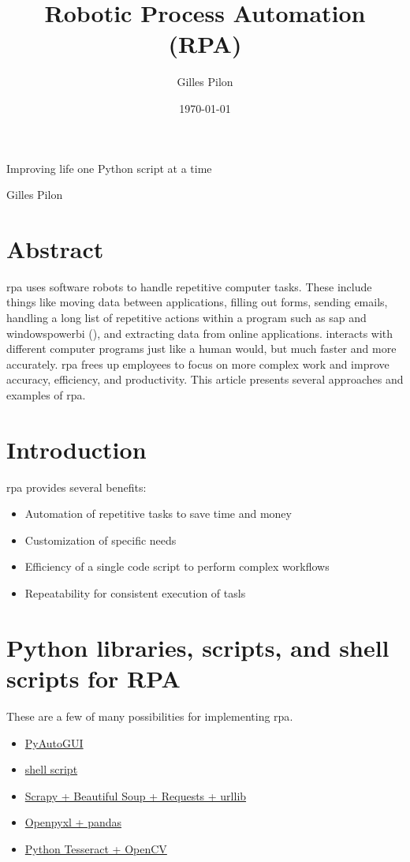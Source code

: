 \documentclass[10pt, letterpaper, twoside]{article}
\title{Robotic Process Automation (RPA)}
\author{Gilles Pilon}
\date{\today}
\begin{document}
\maketitle
\renewcommand{\epigraphflush}{flushleft}
\renewcommand{\textflush}{flushleft}
\renewcommand{\sourceflush}{flushleft}
\epigraph{Improving life one Python script at a time}{Gilles Pilon}
\section*{Abstract}
\Gls{rpa} uses software robots to handle repetitive computer tasks. These include things like moving data between applications, filling out forms, sending emails, handling a long list of repetitive actions within a program such as \Gls{sap} and \Gls{windowspowerbi} (\cite{windowspowerbi}), and extracting data from online applications.  interacts with different computer programs just like a human would, but much faster and more accurately. \Gls{rpa} frees up employees to focus on more complex work and improve accuracy, efficiency, and productivity. This article presents several approaches and examples of \Gls{rpa}.
\newpage
\tableofcontents
\newpage
\section{Introduction}\label{sec:introduction}
\Gls{rpa} provides several benefits:
\begin{itemize}
    \item{Automation of repetitive tasks to save time and money}
    \item{Customization of specific needs}
    \item{Efficiency of a single code script to perform complex workflows}
    \item{Repeatability for consistent execution of tasls}
\end{itemize}
\section{Python libraries, scripts, and shell scripts for RPA}\label{sec:python_libraries_scripts_shell_scripts_for_rpa}
These are a few of many possibilities for implementing \Gls{rpa}.
\begin{itemize}
\item \hyperref[sec:pyautogui]{PyAutoGUI}
\item \hyperref[sec:shell_script]{shell script}
\item \hyperref[sec:scrapy]{Scrapy + Beautiful Soup + Requests + urllib}
\item \hyperref[sec:openpyxl_pandas]{Openpyxl + pandas}
\item \hyperref[sec:pytesseract_opencv]{Python Tesseract + OpenCV}
\end{itemize}
\end{document}
